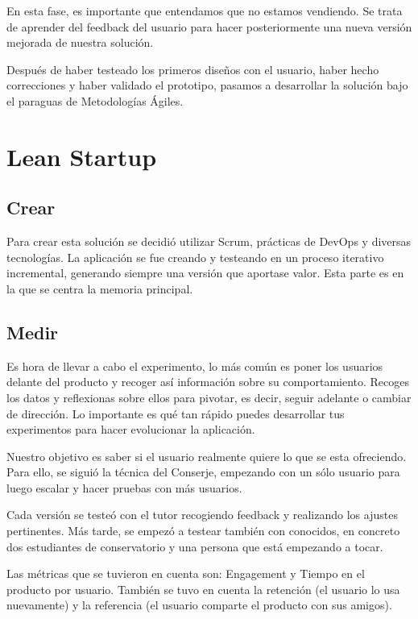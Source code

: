 \documentclass[12pt,twoside,titlepage]{report}
\begin{document}
{En esta fase, es importante que entendamos que no estamos vendiendo. Se trata de aprender del feedback del usuario para hacer posteriormente una nueva versión mejorada de nuestra solución.

Después de haber testeado los primeros diseños con el usuario, haber hecho correcciones y haber validado el prototipo, pasamos a desarrollar la solución bajo el paraguas de Metodologías Ágiles.

\section{Lean Startup}

\subsection{Crear}

Para crear esta solución se decidió utilizar Scrum, prácticas de DevOps y diversas tecnologías. La aplicación se fue creando y testeando en un proceso iterativo incremental, generando siempre una versión que aportase valor.
Esta parte es en la que se centra la memoria principal.

\subsection{Medir}

Es hora de llevar a cabo el experimento, lo más común es poner los usuarios delante del producto y recoger así información sobre su comportamiento. Recoges los datos y reflexionas sobre ellos para pivotar, es decir, seguir adelante o cambiar de dirección. Lo importante es qué tan rápido puedes desarrollar tus experimentos para hacer evolucionar la aplicación. 

Nuestro objetivo es saber si el usuario realmente quiere lo que se esta ofreciendo. Para ello, se siguió la técnica del Conserje, empezando con un sólo usuario para luego escalar y hacer pruebas con más usuarios.

Cada versión se testeó con el tutor recogiendo feedback y realizando los ajustes pertinentes. 
Más tarde, se empezó a testear también con conocidos, en concreto dos estudiantes de conservatorio y una persona que está empezando a tocar.

Las métricas que se tuvieron en cuenta son: Engagement y Tiempo en el producto por usuario. También se tuvo en cuenta la retención (el usuario lo usa nuevamente) y la referencia (el usuario comparte el producto con sus amigos).

}
\end{document}
